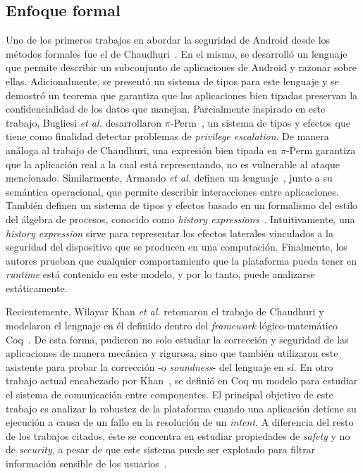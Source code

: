 \subsection*{Enfoque formal}
Uno de los primeros trabajos en abordar la seguridad de Android desde los
métodos formales fue el de Chaudhuri~\cite{chaudhuri}. En el mismo, se desarrolló
un lenguaje que permite describir un subconjunto de aplicaciones de Android y
razonar sobre ellas. Adicionalmente, se presentó un sistema de tipos para este
lenguaje y se demostró un teorema que garantiza que las aplicaciones bien
tipadas preservan la confidencialidad de los datos que manejan. Parcialmente
inspirado en este trabajo, Bugliesi \textit{et al.} desarrollaron
$\pi$-Perm~\cite{bugliesi}, un sistema de tipos y efectos que tiene como
%
%
finalidad detectar problemas de \textit{privilege escalation}. De manera análoga
al trabajo de Chaudhuri, una expresión bien tipada en $\pi$-Perm garantiza que
la aplicación real a la cual está representando, no es vulnerable al ataque
mencionado. Similarmente, Armando \textit{et al.} definen un
lenguaje~\cite{armando}, junto a su semántica operacional, que permite describir
interacciones entre aplicaciones. También definen un sistema de tipos y efectos
basado en un formalismo del estilo del álgebra de procesos, conocido como
\textit{history expressions}~\cite{history-expressions}. Intuitivamente, una
\textit{history expression} sirve para representar los efectos laterales
vinculados a la seguridad del dispositivo que se producen en una computación.
Finalmente, los autores prueban que cualquier comportamiento que la plataforma
pueda tener en \textit{runtime} está contenido en este modelo, y por lo tanto,
puede analizarse estáticamente.

Recientemente, Wilayar Khan \textit{et al.} retomaron el trabajo de Chaudhuri y
modelaron el lenguaje en él definido dentro del \textit{framework}
lógico-matemático Coq~\cite{coq}. De esta forma, pudieron no solo estudiar la
corrección y seguridad de las aplicaciones de manera mecánica y rigurosa, sino
que también utilizaron este asistente para probar la corrección -o
\textit{soundness}- del lenguaje en sí. En otro trabajo actual encabezado por
Khan~\cite{crashsafe}, se definió en Coq un modelo para estudiar el sistema de
comunicación entre componentes. El principal objetivo de este trabajo es
analizar la robustez de la plataforma cuando una aplicación detiene su ejecución
a causa de un fallo en la resolución de un \textit{intent}. A diferencia del
resto de los trabajos citados, éste se concentra en estudiar propiedades de
\textit{safety} y no de \textit{security}, a pesar de que este sistema puede ser
explotado para filtrar información sensible de los usuarios~\cite{iccta}.

